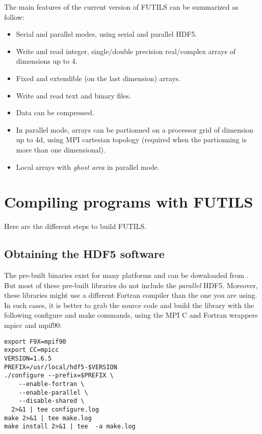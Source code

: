\documentclass[a4paper]{article}
\begin{document}
The main features of the current version of FUTILS can be summarized as follow:
\begin{itemize}
\item  Serial and parallel modes, using serial and parallel HDF5.
\item  Write and read integer, single/double precision real/complex
arrays of dimensions up to 4.
\item  Fixed and extendible (on the last dimension) arrays.
\item  Write and read text and binary files.
\item  Data can be compressed.
\item  In parallel mode, arrays can be partionned on a processor grid of
dimension up to 4d, using MPI cartesian topology (required when the
partionning is more than one dimensional).
\item  Local arrays with {\itshape ghost area\/} in parallel mode.
\end{itemize}





\section{Compiling programs with FUTILS}

Here are the different steps to build FUTILS.


\subsection{Obtaining the HDF5 software}

The pre-built binaries exist for many platforms and can be downloaded from
.
But most of these pre-built libraries do not include the {\itshape parallel\/}
HDF5. Moreover, these libraries might use a different Fortran compiler
than the one you are using. In such cases, it is better to grab the
source code and build the library with the following {\ttfamily configure} and
{\ttfamily make} commands, using the MPI {\ttfamily C} and {\ttfamily Fortran}
wrappers {\ttfamily mpicc} and {\ttfamily mpif90}:
\begin{tscreen}
\begin{verbatim}
export F9X=mpif90
export CC=mpicc
VERSION=1.6.5
PREFIX=/usr/local/hdf5-$VERSION
./configure --prefix=$PREFIX \
    --enable-fortran \
    --enable-parallel \
    --disable-shared \
  2>&1 | tee configure.log
make 2>&1 | tee make.log
make install 2>&1 | tee  -a make.log
\end{verbatim}
\end{tscreen}
\end{document}
